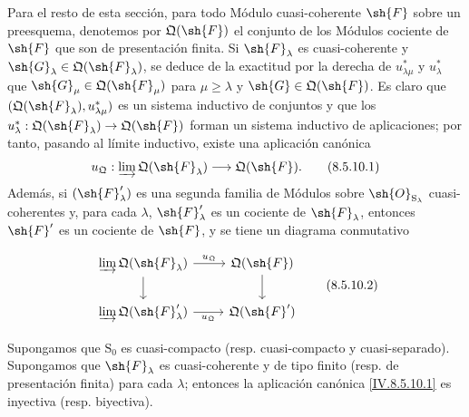 \begin{env}[8.5.10]
\label{IV.8.5.10}
Para el resto de esta sección, para todo Módulo cuasi-coherente $\sh{F}$ sobre un preesquema, denotemos por $\mathfrak{Q}(\sh{F})$ el conjunto de los Módulos cociente de $\sh{F}$ que son de presentación finita. Si $\sh{F}_\lambda$ es cuasi-coherente y $\sh{G}_\lambda\in\mathfrak{Q}(\sh{F}_\lambda)$, se deduce de la exactitud por la derecha de $u_{\lambda\mu}^*$ y $u_\lambda^*$ que $\sh{G}_\mu\in\mathfrak{Q}(\sh{F}_\mu)$ para $\mu\geqslant\lambda$ y $\sh{G}\in\mathfrak{Q}(\sh{F})$. Es claro que $(\mathfrak{Q}(\sh{F}_\lambda),u_{\lambda\mu}^*)$ es un sistema inductivo de conjuntos y que los $u_\lambda^*:\mathfrak{Q}(\sh{F}_\lambda)\to\mathfrak{Q}(\sh{F})$ forman un sistema inductivo de aplicaciones; por tanto, pasando al límite inductivo, existe una aplicación canónica
\[
u_{\mathfrak{Q}}:\varinjlim\mathfrak{Q}(\sh{F}_\lambda)\longrightarrow\mathfrak{Q}(\sh{F}).
\tag{8.5.10.1}\label{IV.8.5.10.1}
\]
Además, si $(\sh{F}'_\lambda)$ es una segunda familia de Módulos sobre $\sh{O}_{\mathrm{S}_\lambda}$ cuasi-coherentes y, para cada $\lambda$, $\sh{F}'_\lambda$ es un cociente de $\sh{F}_\lambda$, entonces $\sh{F}'$ es un cociente de $\sh{F}$, y se tiene un diagrama conmutativo


\[
\begin{tikzcd}
\varinjlim\mathfrak{Q}(\sh{F}_\lambda) \ar[r,"u_{\mathfrak{Q}}"] \ar[d] & \mathfrak{Q}(\sh{F}) \ar[d] \\
\varinjlim\mathfrak{Q}(\sh{F}'_\lambda) \ar[r,"u_{\mathfrak{Q}}"'] & \mathfrak{Q}(\sh{F}')
\end{tikzcd}
\tag{8.5.10.2}\label{IV.8.5.10.2}
\]
\end{env}

\begin{proposition}[8.5.11]
\label{IV.8.5.11}
Supongamos que $\mathrm{S}_0$ es cuasi-compacto (resp. cuasi-compacto y cuasi-separado). Supongamos que $\sh{F}_\lambda$ es cuasi-coherente y de tipo finito (resp. de presentación finita) para cada $\lambda$; entonces la aplicación canónica \eqref{IV.8.5.10.1} es inyectiva (resp. biyectiva).
\end{proposition}

